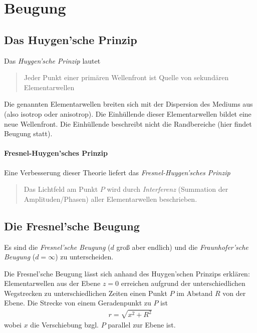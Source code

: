 \section{Beugung}
\subsection{Das Huygen'sche Prinzip}
Das \emph{Huygen'sche Prinzip} lautet
\begin{quote}
  Jeder Punkt einer primären Wellenfront ist Quelle von sekundären
  Elementarwellen
\end{quote}
Die genannten Elementarwellen breiten sich mit der Dispersion des
Mediums aus (also isotrop oder anisotrop).
Die Einhüllende dieser Elementarwellen bildet eine neue Wellenfront.
Die Einhüllende beschreibt nicht die Randbereiche (hier findet Beugung statt).

\paragraph{Fresnel-Huygen'sches Prinzip}
Eine Verbesserung dieser Theorie liefert das 
\emph{Fresnel-Huygen'sches Prinzip}
\begin{quote}
  Das Lichtfeld am Punkt $P$ wird durch \emph{Interferenz} (Summation
  der Amplituden/Phasen) aller Elementarwellen beschrieben.
\end{quote}


\subsection{Die Fresnel'sche Beugung}
Es sind die \emph{Fresnel'sche Beugung} 
($d$ groß aber endlich) und die \emph{Fraunhofer'sche Beugung}%
 ($d=\infty$) zu unterscheiden.

Die Fresnel'sche Beugung lässt sich anhand des Huygen'schen Prinzips
erklären:
Elementarwellen aus der Ebene $z=0$ erreichen aufgrund der
unterschiedlichen Wegstrecken zu unterschiedlichen Zeiten einen Punkt
$P$ im Abstand $R$ von der Ebene.
Die Strecke von einem Geradenpunkt zu $P$ ist
\begin{gather*}
  r = \sqrt{x^2+R^2}
\end{gather*}
wobei $x$ die Verschiebung bzgl. $P$ parallel zur Ebene ist.

